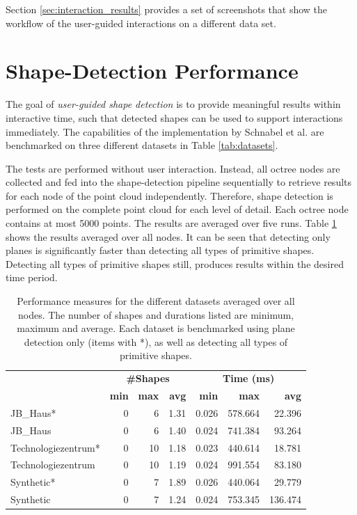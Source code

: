 Section \ref{sec:interaction_results} provides a set of screenshots that show the workflow of the user-guided interactions on a different data set. 


\section{Shape-Detection Performance}
\label{sec:shape_detection_performance}

The goal of \textit{user-guided shape detection} is to provide meaningful results within interactive time, such that detected shapes can be used to support interactions immediately. The capabilities of the implementation by Schnabel et al. \cite{schnabel-2007-software} are benchmarked on three different datasets in Table \ref{tab:datasets}. 

\par

The tests are performed without user interaction. Instead, all octree nodes are collected and fed into the shape-detection pipeline sequentially to retrieve results for each node of the point cloud independently. Therefore, shape detection is performed on the complete point cloud for each level of detail. Each octree node contains at most 5000 points. The results are averaged over five runs. Table \ref{table:schnabel_benchmarks} shows the results averaged over all nodes. It can be seen that detecting only planes is significantly faster than detecting all types of primitive shapes. Detecting all types of primitive shapes still, produces results within the desired time period. 

\begin{table}
    \centering
    \begin{tabular}{ l || r | r | r || r | r | r}
            &\multicolumn{3}{c||}{\textbf{\#Shapes}} & \multicolumn{3}{c}{\textbf{Time (ms)}}\\
            &\textbf{min} & \textbf{max} & \textbf{avg}  & \textbf{min} & \textbf{max} & \textbf{avg}  \\
            \hline
            JB\_Haus*           & 0 & 6  & 1.31 & 0.026 & 578.664 &  22.396 \\
            JB\_Haus            & 0 & 6  & 1.40 & 0.024 & 741.384 &  93.264 \\
            Technologiezentrum* & 0 & 10 & 1.18 & 0.023 & 440.614 &  18.781 \\
            Technologiezentrum  & 0 & 10 & 1.19 & 0.024 & 991.554 &  83.180 \\
            Synthetic*          & 0 & 7  & 1.89 & 0.026 & 440.064 &  29.779 \\
            Synthetic           & 0 & 7  & 1.24 & 0.024 & 753.345 & 136.474 \\
        \end{tabular}
    \caption[Shape-detection performance measure for different datasets]
        {Performance measures for the different datasets averaged over all nodes. The number of shapes and durations listed are minimum, maximum and average. Each dataset is benchmarked using plane detection only (items with *), as well as detecting all types of primitive shapes. }
    \label{table:schnabel_benchmarks}
\end{table}


